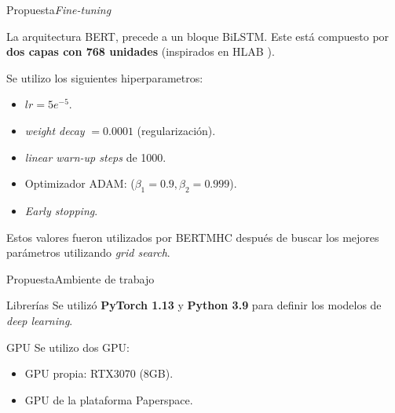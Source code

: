 \documentclass[10pt]{beamer}
\newcommand{\1}{
	\setbeamertemplate{background}{
		\texttt{[image: img/1]}
		\tikz[overlay] \fill[fill opacity=0.75,fill=white] (0,0) rectangle (-\paperwidth,\paperheight);
	}
}
\begin{document}
\begin{frame}{Propuesta}{\textit{Fine-tuning}}
	
	\begin{block}{}
		La arquitectura BERT, precede a un bloque BiLSTM. Este está compuesto por\textbf{ dos capas con 768 unidades} (inspirados en HLAB \cite{zhang2022hlab}).
	\end{block}

	\begin{block}{}
		Se utilizo los siguientes hiperparametros:
		\begin{itemize}
			\item $lr = 5e^{-5}$.
			\item \textit{weight decay} $ =0.0001$ (regularización).
			\item \textit{linear warn-up steps} de 1000.
			\item Optimizador ADAM: ($\beta_1 = 0.9, \beta_2=0.999$).
			\item \textit{Early stopping}.
		\end{itemize}
	
		  Estos valores fueron utilizados por BERTMHC \cite{cheng2021bertmhc} después de buscar los mejores parámetros utilizando \textit{grid search}.
	\end{block}
	
\end{frame}

\begin{frame}{Propuesta}{Ambiente de trabajo}
	
	\begin{block}{Librerías}
		Se utilizó \textbf{PyTorch 1.13} y\textbf{ Python 3.9} para definir los modelos de \textit{deep learning}.
	\end{block}
	
	\begin{block}{GPU}
		Se utilizo dos GPU: 
		\begin{itemize}
			\item GPU propia: RTX3070 (8GB).
			\item GPU de la plataforma Paperspace.
		\end{itemize}
	\end{block}
\end{frame}
\end{document}
